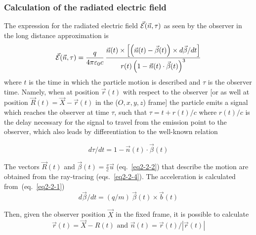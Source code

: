\subsubsection{Calculation of the radiated  electric field  \label{secN4.1}}


The expression for  the radiated  electric field $\vec {\mathcal{E}} (\vec{n}, \tau)$ 
as seen by the observer in the long
distance approximation is~\cite{JDJ}
\begin{equation}
\vec \Ecal (\vec{n}, \tau) = 
	\frac{q}{4\pi\varepsilon_0c}\, 
	\frac{\vec{n}(t) \times \left[
		\left(\vec{n}(t)- \vec{\beta}(t) \right) 
		\times d\vec{\beta}/dt \right]}%
	{r(t) \left(1 - \vec{n}(t)\cdot\vec{\beta}(t) \right)^3}
 \label{eqN4.1}
\end{equation}
%
where $t$ is the time in which the particle motion is described and $\tau$ is the
observer time. Namely, when at position $\vec{r}(t)$ with respect to the observer [or as
well at position $\vec{R}(t) = \vec{X} - \vec{r}(t)$ in the ($O, x, y, z$) frame] the
particle emits a signal which reaches the observer at time $\tau$, such that $\tau = t +
r(t)/c$ where  $r(t)/c$ is the delay necessary for the signal to travel from the
emission point to the observer, which also leads by differentiation to the well-known
 relation

\begin{equation}
d\tau/dt = 1 - \vec{n}(t) \cdot \vec{\beta}(t)  \label{eqN4.2}
\end{equation} 

\noindent The vectors $\vec{R}(t)$ and $\vec{\beta}(t) = \frac{v}{c} \vec u$ (eq.~\ref{eq2-2-2}) that describe the motion are obtained from the ray-tracing (eqs.~\ref{eq2-2-4}). The acceleration is calculated  from~(eq.~\ref{eq2-2-1})
\begin{equation}
d\vec{\beta}/dt = (q/m)~\vec{\beta}(t) \times \vec{b}(t) \label{eqN4.3}
\end{equation} %

\noindent Then, given the observer position $\vec{X}$ in the fixed frame, it is possible
to calculate
\begin{equation}
\vec{r}(t) = \vec{X} - R(t) \text{ and } \vec{n}(t) = \vec{r}(t)/ |\vec{r}(t)| \label{eqN4.4}
\end{equation} %

